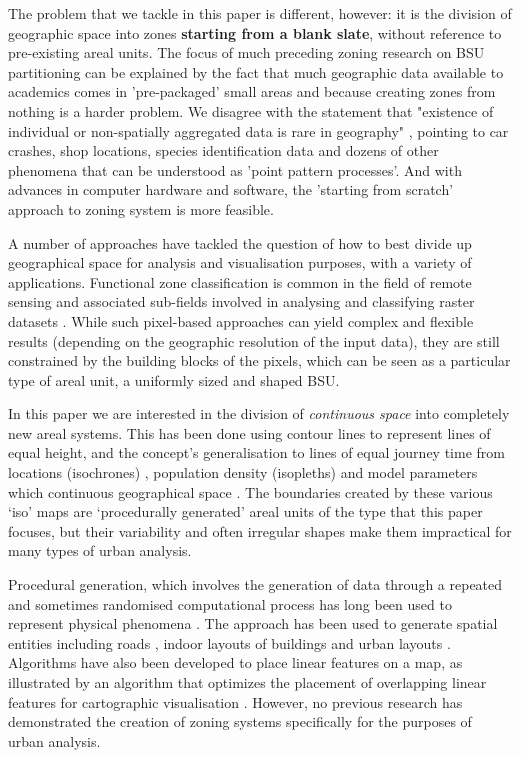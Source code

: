 \documentclass{josis}
\begin{document}
The problem that we tackle in this paper is different, however: it is the division of geographic space into zones \textbf{starting from a blank slate}, without reference to pre-existing areal units.
The focus of much preceding zoning research on BSU partitioning can be explained by the fact that much geographic data available to academics comes in 'pre-packaged' small areas and because creating zones from nothing is a harder problem.
We disagree with the statement that "existence of individual or non-spatially aggregated data is rare in geography" \cite{openshaw_optimal_1977}, pointing to car crashes, shop locations, species identification data and dozens of other phenomena that can be understood as 'point pattern processes'.
And with advances in computer hardware and software, the 'starting from scratch' approach to zoning system is more feasible.

A number of approaches have tackled the question of how to best divide up geographical space for analysis and visualisation purposes, with a variety of applications.
Functional zone classification is common in the field of remote sensing and associated sub-fields involved in analysing and classifying raster datasets \cite{ciglic_evaluating_2019} \cite{hesselbarth_landscapemetrics_2019}.
While such pixel-based approaches can yield complex and flexible results (depending on the geographic resolution of the input data), they are still constrained by the building blocks of the pixels, which can be seen as a particular type of areal unit, a uniformly sized and shaped BSU.

In this paper we are interested in the division of \emph{continuous space} into completely new areal systems.
This has been done using contour lines to represent lines of equal height, and the concept's generalisation to lines of equal journey time from locations (isochrones) \cite{long_modeling_2018}, population density (isopleths) \cite{lin_cartographic_2017} and model parameters which continuous geographical space \cite{paez_exploring_2006}.
The boundaries created by these various `iso' maps are `procedurally generated' areal units of the type that this paper focuses, but their variability and often irregular shapes make them impractical for many types of urban analysis.

Procedural generation, which involves the generation of data through a repeated and sometimes randomised computational process has long been used to represent physical phenomena \cite{onrust_ecologically_2017}.
The approach has been used to generate spatial entities including roads \cite{galin_procedural_2010}, indoor layouts of buildings \cite{anderson_augmented_2018} and urban layouts \cite{mustafa_procedural_2020}.
Algorithms have also been developed to place linear features on a map, as illustrated by an algorithm that optimizes the placement of overlapping linear features for cartographic visualisation \cite{teulade-denantes_routes_2015}.
However, no previous research has demonstrated the creation of zoning systems specifically for the purposes of urban analysis.
\end{document}
